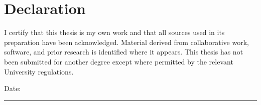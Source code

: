 \chapter*{Declaration}

I certify that this thesis is my own work and that all sources used in its
preparation have been acknowledged. Material derived from collaborative work,
software, and prior research is identified where it appears. This thesis has
not been submitted for another degree except where permitted by the relevant
University regulations.

\vspace{18mm}
\noindent\thesisauthor

\vspace{8mm}
\noindent Date: \rule{45mm}{0.4pt}

